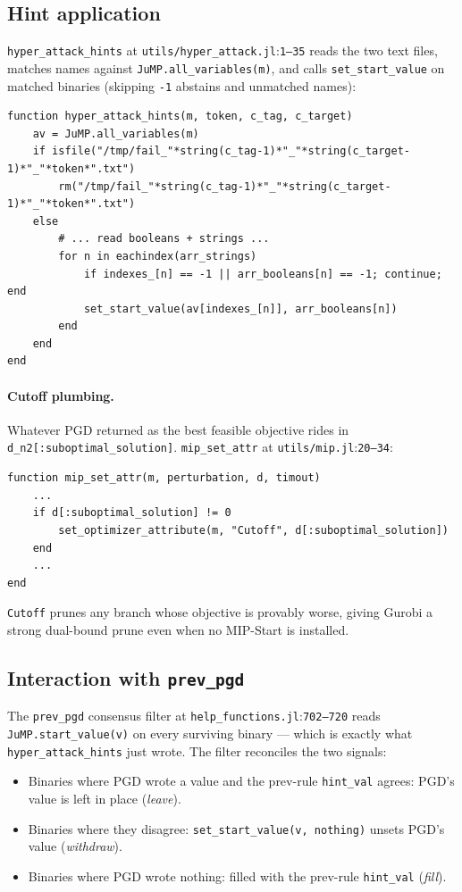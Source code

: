 \documentclass[11pt]{article}
\newcommand{\src}[1]{\texttt{\small #1}}
\newcommand{\fileline}[2]{\src{#1}:\src{#2}}
\begin{document}
\subsection{Hint application}

\src{hyper\_attack\_hints} at \fileline{utils/hyper\_attack.jl}{1--35}
reads the two text files, matches names against
\src{JuMP.all\_variables(m)}, and calls \src{set\_start\_value} on
matched binaries (skipping \src{-1} abstains and unmatched names):

\begin{lstlisting}[style=jl]
function hyper_attack_hints(m, token, c_tag, c_target)
    av = JuMP.all_variables(m)
    if isfile("/tmp/fail_"*string(c_tag-1)*"_"*string(c_target-1)*"_"*token*".txt")
        rm("/tmp/fail_"*string(c_tag-1)*"_"*string(c_target-1)*"_"*token*".txt")
    else
        # ... read booleans + strings ...
        for n in eachindex(arr_strings)
            if indexes_[n] == -1 || arr_booleans[n] == -1; continue; end
            set_start_value(av[indexes_[n]], arr_booleans[n])
        end
    end
end
\end{lstlisting}

\paragraph{Cutoff plumbing.}
Whatever PGD returned as the best feasible objective rides in
\src{d\_n2[:suboptimal\_solution]}. \src{mip\_set\_attr} at
\fileline{utils/mip.jl}{20--34}:
\begin{lstlisting}[style=jl]
function mip_set_attr(m, perturbation, d, timout)
    ...
    if d[:suboptimal_solution] != 0
        set_optimizer_attribute(m, "Cutoff", d[:suboptimal_solution])
    end
    ...
end
\end{lstlisting}
\texttt{Cutoff} prunes any branch whose objective is provably worse,
giving Gurobi a strong dual-bound prune even when no MIP-Start is
installed.

\subsection{Interaction with \texttt{prev\_pgd}}

The \texttt{prev\_pgd} consensus filter at
\fileline{help\_functions.jl}{702--720} reads
\src{JuMP.start\_value(v)} on every surviving binary --- which is
exactly what \src{hyper\_attack\_hints} just wrote. The filter
reconciles the two signals:

\begin{itemize}[noitemsep]
  \item Binaries where PGD wrote a value and the prev-rule
    \src{hint\_val} agrees: PGD's value is left in place
    (\emph{leave}).
  \item Binaries where they disagree: \src{set\_start\_value(v,
    nothing)} unsets PGD's value (\emph{withdraw}).
  \item Binaries where PGD wrote nothing: filled with the prev-rule
    \src{hint\_val} (\emph{fill}).
\end{itemize}
\end{document}
